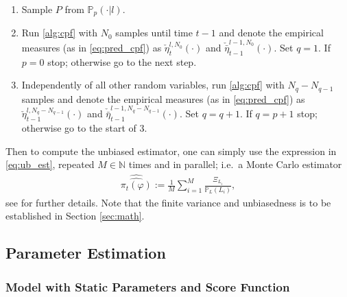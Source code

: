 \documentclass[english]{article}
\begin{document}
\begin{algorithm}[H]
\begin{enumerate}
\item{Sample $P$ from $\mathbb{P}_p(\cdot|l)$.}
\item{Run \autoref{alg:cpf} with $N_0$ samples until time $t-1$ and 
denote the empirical measures 
(as in \eqref{eq:pred_cpf}) as $\check{\eta}_t^{l,N_0}(\cdot)$ and $\check{\bar{\eta}}_{t-1}^{l-1,N_0}(\cdot)$. Set $q=1$. If $p=0$ stop; otherwise go to the next step.}
\item{Independently of all other random variables, run \autoref{alg:cpf} with $N_q-N_{q-1}$ samples and denote the 
empirical measures (as in \eqref{eq:pred_cpf}) as $\check{\eta}_{t-1}^{l,N_q-N_{q-1}}(\cdot)$ and $\check{\bar{\eta}}_{t-1}^{l-1,N_q-N_{q-1}}(\cdot)$. Set $q=q+1$. If $q=p+1$ stop; otherwise go to the start of 3.}
\end{enumerate}
\caption{Computing $\Xi_l$. Throughout $(t,l)\in\mathbb{N}\times\mathbb{N}$ are given.}
\label{alg:xi_l}
\end{algorithm}

Then to compute the unbiased estimator, one can simply use the expression in \eqref{eq:ub_est}, repeated $M\in\mathbb{N}$ times and in parallel; i.e.~a Monte Carlo estimator
\begin{align}
\label{eq:ub_est_M}
\widehat{\widehat{\pi_t(\varphi)}} := \frac{1}{M}\sum_{i=1}^M \frac{\Xi_{L_i}}{\mathbb{P}_L(L_i)},
\end{align}
 see \cite[Algorithm 5]{ub_pf} for further details.
Note that the finite variance and unbiasedness is to be established in Section \ref{sec:math}.

\subsection{Parameter Estimation}\label{sec:online}
\subsubsection{Model with Static Parameters and Score Function}
\end{document}
